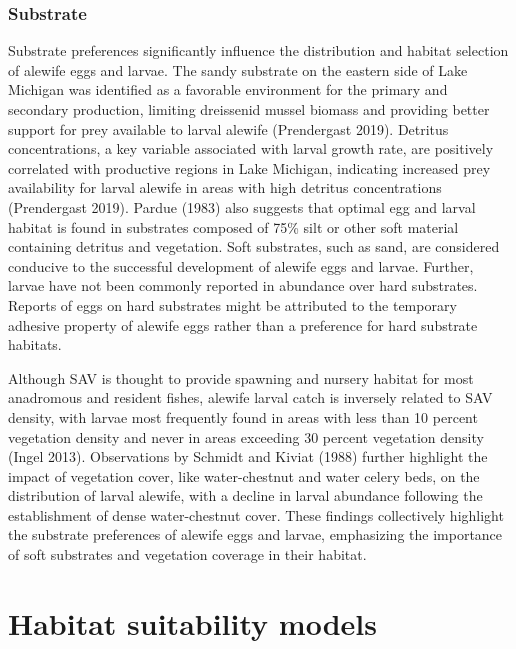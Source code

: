 \documentclass[
]{book}
\begin{document}
\hypertarget{substrate-2}{%
\subsubsection{Substrate}\label{substrate-2}}

Substrate preferences significantly influence the distribution and habitat selection of alewife eggs and larvae. The sandy substrate on the eastern side of Lake Michigan was identified as a favorable environment for the primary and secondary production, limiting dreissenid mussel biomass and providing better support for prey available to larval alewife (Prendergast 2019). Detritus concentrations, a key variable associated with larval growth rate, are positively correlated with productive regions in Lake Michigan, indicating increased prey availability for larval alewife in areas with high detritus concentrations (Prendergast 2019). Pardue (1983) also suggests that optimal egg and larval habitat is found in substrates composed of 75\% silt or other soft material containing detritus and vegetation. Soft substrates, such as sand, are considered conducive to the successful development of alewife eggs and larvae. Further, larvae have not been commonly reported in abundance over hard substrates. Reports of eggs on hard substrates might be attributed to the temporary adhesive property of alewife eggs rather than a preference for hard substrate habitats.

Although SAV is thought to provide spawning and nursery habitat for most anadromous and resident fishes, alewife larval catch is inversely related to SAV density, with larvae most frequently found in areas with less than 10 percent vegetation density and never in areas exceeding 30 percent vegetation density (Ingel 2013). Observations by Schmidt and Kiviat (1988) further highlight the impact of vegetation cover, like water-chestnut and water celery beds, on the distribution of larval alewife, with a decline in larval abundance following the establishment of dense water-chestnut cover. These findings collectively highlight the substrate preferences of alewife eggs and larvae, emphasizing the importance of soft substrates and vegetation coverage in their habitat.

\hypertarget{habitat-suitability-models}{%
\section{Habitat suitability models}\label{habitat-suitability-models}}
\end{document}

